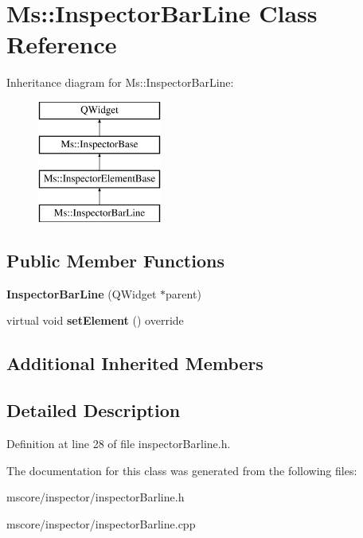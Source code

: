 \hypertarget{class_ms_1_1_inspector_bar_line}{}\section{Ms\+:\+:Inspector\+Bar\+Line Class Reference}
\label{class_ms_1_1_inspector_bar_line}
Inheritance diagram for Ms\+:\+:Inspector\+Bar\+Line\+:\begin{figure}[H]
\begin{center}
\leavevmode
\includegraphics[height=4.000000cm]{class_ms_1_1_inspector_bar_line}
\end{center}
\end{figure}
\subsection*{Public Member Functions}
\begin{DoxyCompactItemize}
\item 
\mbox{\label{class_ms_1_1_inspector_bar_line_ac844d79426550ab44d8cb55df5b2e065}} 
{\bfseries Inspector\+Bar\+Line} (Q\+Widget $\ast$parent)
\item 
\mbox{\label{class_ms_1_1_inspector_bar_line_a7dbe4a49705c2e509d3f48c4c5c7dde9}} 
virtual void {\bfseries set\+Element} () override
\end{DoxyCompactItemize}
\subsection*{Additional Inherited Members}


\subsection{Detailed Description}


Definition at line 28 of file inspector\+Barline.\+h.



The documentation for this class was generated from the following files\+:\begin{DoxyCompactItemize}
\item 
mscore/inspector/inspector\+Barline.\+h\item 
mscore/inspector/inspector\+Barline.\+cpp\end{DoxyCompactItemize}
